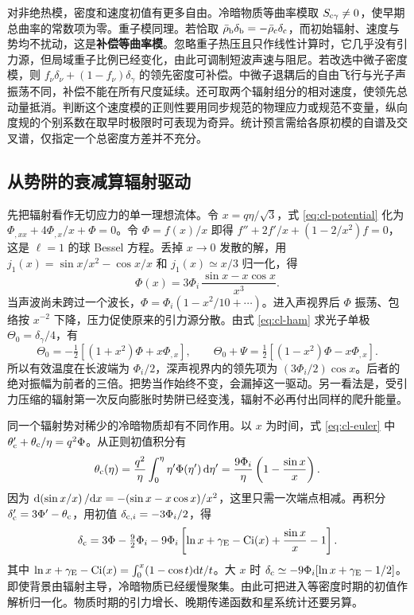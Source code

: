对非绝热模，密度和速度初值有更多自由。冷暗物质等曲率模取 $S_{\rm c\gamma}\ne0$，使早期总曲率的常数项为零。重子模同理。若恰取 $\bar\rho_{\rm b}\delta_{\rm b}=-\bar\rho_{\rm c}\delta_{\rm c}$，而初始辐射、速度与势均不扰动，这是\textbf{补偿等曲率模}。忽略重子热压且只作线性计算时，它几乎没有引力源，但局域重子比例已经变化，由此可调制短波声速与阻尼。若改选中微子密度模，则 $f_\nu\delta_\nu+(1-f_\nu)\delta_\gamma$ 的领先密度可补偿。中微子退耦后的自由飞行与光子声振荡不同，补偿不能在所有尺度延续。还可取两个辐射组分的相对速度，使领先总动量抵消。判断这个速度模的正则性要用同步规范的物理应力或规范不变量，纵向度规的个别系数在取早时极限时可表现为奇异。统计预言需给各原初模的自谱及交叉谱，仅指定一个总密度方差并不充分。

\subsection{从势阱的衰减算辐射驱动}

先把辐射看作无切应力的单一理想流体。令 $x=q\eta/\sqrt3$，式 \eqref{eq:cl-potential} 化为 $\Phi_{,xx}+4\Phi_{,x}/x+\Phi=0$。令 $\Phi=f(x)/x$ 即得 $f''+2f'/x+(1-2/x^2)f=0$，这是 $\ell=1$ 的球 Bessel 方程。丢掉 $x\to0$ 发散的解，用 $j_1(x)=\sin x/x^2-\cos x/x$ 和 $j_1(x)\simeq x/3$ 归一化，得
\begin{equation}\label{eq:cl-radphi}
 \Phi(x)=3\Phi_i\,\frac{\sin x-x\cos x}{x^3}.
\end{equation}
当声波尚未跨过一个波长，$\Phi=\Phi_i(1-x^2/10+\cdots)$。进入声视界后 $\Phi$ 振荡、包络按 $x^{-2}$ 下降，压力促使原来的引力源分散。由式 \eqref{eq:cl-ham} 求光子单极 $\Theta_0=\delta_\gamma/4$，有
\[
 \Theta_0=-\tfrac12[(1+x^2)\Phi+x\Phi_{,x}],\qquad
 \Theta_0+\Psi=\tfrac12[(1-x^2)\Phi-x\Phi_{,x}] .
\]
所以有效温度在长波端为 $\Phi_i/2$，深声视界内的领先项为 $(3\Phi_i/2)\cos x$。后者的绝对振幅为前者的三倍。把势当作始终不变，会漏掉这一驱动。另一看法是，受引力压缩的辐射第一次反向膨胀时势阱已经变浅，辐射不必再付出同样的爬升能量。

同一个辐射势对稀少的冷暗物质却有不同作用。以 $x$ 为时间，式 \eqref{eq:cl-euler} 中 $\theta_{\rm c}'+\theta_{\rm c}/\eta=q^2\Phi$。从正则初值积分有
\[
 \theta_{\rm c}(\eta)=\frac{q^2}{\eta}\int_0^\eta \eta'\Phi(\eta')\,\dd\eta'
     =\frac{9\Phi_i}{\eta}\left(1-\frac{\sin x}{x}\right).
\]
因为 $\dd(\sin x/x)/\dd x=-(\sin x-x\cos x)/x^2$，这里只需一次端点相减。再积分 $\delta_{\rm c}'=3\Phi'-\theta_{\rm c}$，用初值 $\delta_{{\rm c},i}=-3\Phi_i/2$，得
\[
 \delta_{\rm c}=3\Phi-\tfrac92\Phi_i
   -9\Phi_i\left[\ln x+\gamma_{\rm E}-{\rm Ci}(x)+\frac{\sin x}{x}-1\right].
\]
其中 $\ln x+\gamma_{\rm E}-{\rm Ci}(x)=\int_0^x(1-\cos t)\dd t/t$。大 $x$ 时 $\delta_{\rm c}\simeq-9\Phi_i[\ln x+\gamma_{\rm E}-1/2]$。即使背景由辐射主导，冷暗物质已经缓慢聚集。由此可把进入等密度时期的初值作解析归一化。物质时期的引力增长、晚期传递函数和星系统计还要另算。


